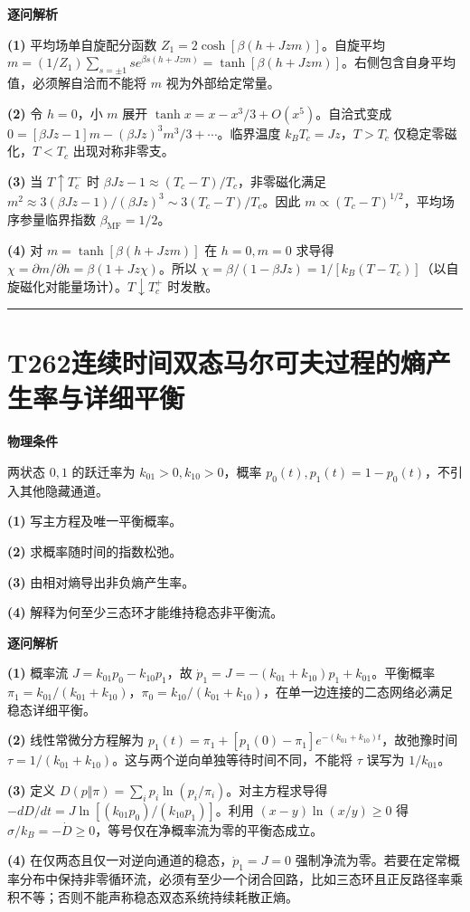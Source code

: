 \documentclass[UTF8,a4paper,11pt,oneside,openany]{ctexbook}
\begin{document}
\par\medskip\noindent\textbf{逐问解析}
\par\noindent\textbf{(1)} 平均场单自旋配分函数 \(Z_1=2\cosh[\beta(h+Jzm)]\)。自旋平均 \(m=(1/Z_1)\sum_{s=\pm1}s e^{\beta s(h+Jzm)}=\tanh[\beta(h+Jzm)]\)。右侧包含自身平均值，必须解自洽而不能将 \(m\) 视为外部给定常量。
\par\noindent\textbf{(2)} 令 \(h=0\)，小 \(m\) 展开 \(\tanh x=x-x^3/3+O(x^5)\)。自洽式变成 \(0=[\beta Jz-1]m-(\beta Jz)^3m^3/3+\cdots\)。临界温度 \(k_BT_c=Jz\)，\(T>T_c\) 仅稳定零磁化，\(T<T_c\) 出现对称非零支。
\par\noindent\textbf{(3)} 当 \(T\uparrow T_c^-\) 时 \(\beta Jz-1\approx(T_c-T)/T_c\)，非零磁化满足 \(m^2\approx3(\beta Jz-1)/(\beta Jz)^3\sim3(T_c-T)/T_c\)。因此 \(m\propto(T_c-T)^{1/2}\)，平均场序参量临界指数 \(\beta_{\mathrm{MF}}=1/2\)。
\par\noindent\textbf{(4)} 对 \(m=\tanh[\beta(h+Jzm)]\) 在 \(h=0,m=0\) 求导得 \(\chi=\partial m/\partial h=\beta(1+Jz\chi)\)。所以 \(\chi=\beta/(1-\beta Jz)=1/[k_B(T-T_c)]\)（以自旋磁化对能量场计）。\(T\downarrow T_c^+\) 时发散。

\par\bigskip\hrule\bigskip
\section*{T262\quad 连续时间双态马尔可夫过程的熵产生率与详细平衡}
\textbf{物理条件}\par 两状态 \(0,1\) 的跃迁率为 \(k_{01}>0,k_{10}>0\)，概率 \(p_0(t),p_1(t)=1-p_0(t)\)，不引入其他隐藏通道。
\par\noindent\textbf{(1)} 写主方程及唯一平衡概率。
\par\noindent\textbf{(2)} 求概率随时间的指数松弛。
\par\noindent\textbf{(3)} 由相对熵导出非负熵产生率。
\par\noindent\textbf{(4)} 解释为何至少三态环才能维持稳态非平衡流。

\par\medskip\noindent\textbf{逐问解析}
\par\noindent\textbf{(1)} 概率流 \(J=k_{01}p_0-k_{10}p_1\)，故 \(\dot p_1=J=- (k_{01}+k_{10})p_1+k_{01}\)。平衡概率 \(\pi_1=k_{01}/(k_{01}+k_{10})\)，\(\pi_0=k_{10}/(k_{01}+k_{10})\)，在单一边连接的二态网络必满足稳态详细平衡。
\par\noindent\textbf{(2)} 线性常微分方程解为 \(p_1(t)=\pi_1+[p_1(0)-\pi_1]e^{-(k_{01}+k_{10})t}\)，故弛豫时间 \(\tau=1/(k_{01}+k_{10})\)。这与两个逆向单独等待时间不同，不能将 \(\tau\) 误写为 \(1/k_{01}\)。
\par\noindent\textbf{(3)} 定义 \(D(p\Vert\pi)=\sum_ip_i\ln(p_i/\pi_i)\)。对主方程求导得 \(-dD/dt=J\ln[(k_{01}p_0)/(k_{10}p_1)]\)。利用 \((x-y)\ln(x/y)\ge0\) 得 \(\sigma/k_B=-\dot D\ge0\)，等号仅在净概率流为零的平衡态成立。
\par\noindent\textbf{(4)} 在仅两态且仅一对逆向通道的稳态，\(\dot p_1=J=0\) 强制净流为零。若要在定常概率分布中保持非零循环流，必须有至少一个闭合回路，比如三态环且正反路径率乘积不等；否则不能声称稳态双态系统持续耗散正熵。
\end{document}
